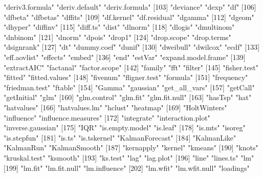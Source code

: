 \documentclass[tutorial.tex]{subfiles}
\begin{document}
\begin{Schunk}
\begin{Soutput}
[100] "deriv3.formula"       "deriv.default"        "deriv.formula"       
[103] "deviance"             "dexp"                 "df"                  
[106] "dfbeta"               "dfbetas"              "dffits"              
[109] "df.kernel"            "df.residual"          "dgamma"              
[112] "dgeom"                "dhyper"               "diffinv"             
[115] "diff.ts"              "dist"                 "dlnorm"              
[118] "dlogis"               "dmultinom"            "dnbinom"             
[121] "dnorm"                "dpois"                "drop1"               
[124] "drop.scope"           "drop.terms"           "dsignrank"           
[127] "dt"                   "dummy.coef"           "dunif"               
[130] "dweibull"             "dwilcox"              "ecdf"                
[133] "eff.aovlist"          "effects"              "embed"               
[136] "end"                  "estVar"               "expand.model.frame"  
[139] "extractAIC"           "factanal"             "factor.scope"        
[142] "family"               "fft"                  "filter"              
[145] "fisher.test"          "fitted"               "fitted.values"       
[148] "fivenum"              "fligner.test"         "formula"             
[151] "frequency"            "friedman.test"        "ftable"              
[154] "Gamma"                "gaussian"             "get_all_vars"        
[157] "getCall"              "getInitial"           "glm"                 
[160] "glm.control"          "glm.fit"              "glm.fit.null"        
[163] "hasTsp"               "hat"                  "hatvalues"           
[166] "hatvalues.lm"         "hclust"               "heatmap"             
[169] "HoltWinters"          "influence"            "influence.measures"  
[172] "integrate"            "interaction.plot"     "inverse.gaussian"    
[175] "IQR"                  "is.empty.model"       "is.leaf"             
[178] "is.mts"               "isoreg"               "is.stepfun"          
[181] "is.ts"                "is.tskernel"          "KalmanForecast"      
[184] "KalmanLike"           "KalmanRun"            "KalmanSmooth"        
[187] "kernapply"            "kernel"               "kmeans"              
[190] "knots"                "kruskal.test"         "ksmooth"             
[193] "ks.test"              "lag"                  "lag.plot"            
[196] "line"                 "lines.ts"             "lm"                  
[199] "lm.fit"               "lm.fit.null"          "lm.influence"        
[202] "lm.wfit"              "lm.wfit.null"         "loadings"            

\end{Soutput}
\end{Schunk}
\end{document}
